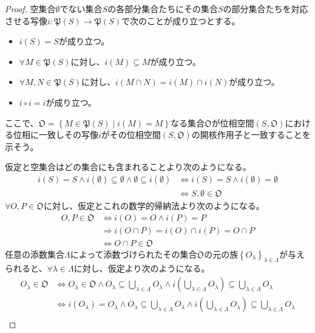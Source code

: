 \documentclass[dvipdfmx]{jsarticle}
\begin{document}
\begin{proof}
空集合$\emptyset$でない集合$S$の各部分集合たちにその集合$S$の部分集合たちを対応させる写像$i:\mathfrak{P}(S)\mathfrak{\rightarrow P}(S)$で次のことが成り立つとする。
\begin{itemize}
\item
  $i(S) = S$が成り立つ。
\item
  $\forall M\in \mathfrak{P}(S)$に対し、$i(M) \subseteq M$が成り立つ。
\item
  $\forall M,N\in \mathfrak{P}(S)$に対し、$i(M \cap N) = i(M) \cap i(N)$が成り立つ。
\item
  $i \circ i = i$が成り立つ。
\end{itemize}
ここで、$\mathfrak{O}=\left\{ M \in \mathfrak{P}(S) \middle| i(M) = M \right\}$なる集合$\mathfrak{O}$が位相空間$\left( S,\mathfrak{O} \right)$における位相に一致しその写像$i$がその位相空間$\left( S,\mathfrak{O} \right)$の開核作用子と一致することを示そう。\par
仮定と空集合はどの集合にも含まれることより次のようになる。
\begin{align*}
i(S) = S \land i(\emptyset) \subseteq \emptyset \land \emptyset \subseteq i(\emptyset) &\Leftrightarrow i(S) = S \land i(\emptyset) = \emptyset\\
&\Leftrightarrow S,\emptyset \in \mathfrak{O}
\end{align*}
$\forall O,P \in \mathfrak{O}$に対し、仮定とこれの数学的帰納法より次のようになる。
\begin{align*}
O,P \in \mathfrak{O} &\Leftrightarrow i(O) = O \land i(P) = P\\
&\Rightarrow i(O \cap P) = i(O) \cap i(P) = O \cap P\\
&\Leftrightarrow O \cap P \in \mathfrak{O}
\end{align*}
任意の添数集合$\varLambda$によって添数づけられたその集合$\mathfrak{O}$の元の族$\left\{ O_{\lambda} \right\}_{\lambda \in \varLambda}$が与えられると、$\forall\lambda \in \varLambda$に対し、仮定より次のようになる。
\begin{align*}
O_{\lambda}\in \mathfrak{O} &\Leftrightarrow O_{\lambda}\in \mathfrak{O \land}O_{\lambda} \subseteq \bigcup_{\lambda \in \varLambda} O_{\lambda} \land i\left( \bigcup_{\lambda \in \varLambda} O_{\lambda} \right) \subseteq \bigcup_{\lambda \in \varLambda} O_{\lambda}\\
&\Leftrightarrow i\left( O_{\lambda} \right) = O_{\lambda} \land O_{\lambda} \subseteq \bigcup_{\lambda \in \varLambda} O_{\lambda} \land i\left( \bigcup_{\lambda \in \varLambda} O_{\lambda} \right) \subseteq \bigcup_{\lambda \in \varLambda} O_{\lambda}\\

\end{align*}
\end{proof}
\end{document}
